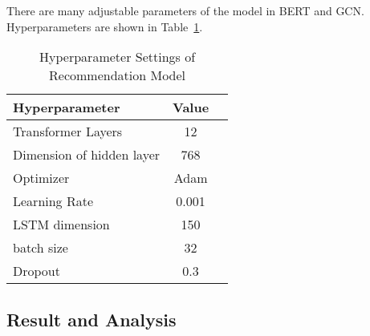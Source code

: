 There are many adjustable parameters of the model in BERT and GCN\@. Hyperparameters are shown in Table~\ref{table:ch2-hpsetting}.
\begin{table}[htbp!]
	\caption{Hyperparameter Settings of Recommendation Model}\label{table:ch2-hpsetting}
	\centering
	\begin{tabular}{l c c}
		\toprule
		Hyperparameter            & Value \\
		\midrule
		Transformer Layers        & 12    \\
		Dimension of hidden layer & 768   \\
		Optimizer                 & Adam  \\
		Learning Rate             & 0.001 \\
		LSTM dimension            & 150   \\
		batch size                & 32    \\
		Dropout                   & 0.3   \\
		\midrule
		\bottomrule
	\end{tabular}
\end{table}






\subsection{Result and Analysis}

